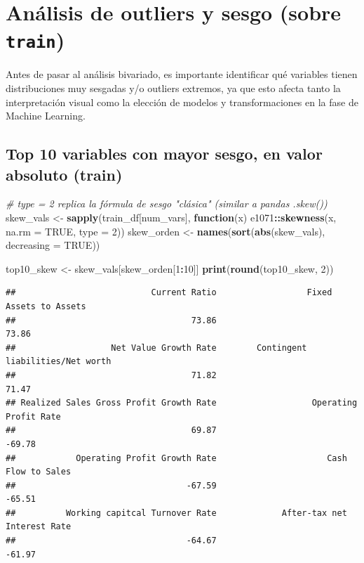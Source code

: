 \documentclass[
]{book}
\newenvironment{Shaded}{\begin{snugshade}}{\end{snugshade}}
\newcommand{\AttributeTok}[1]{\textcolor[rgb]{0.13,0.29,0.53}{#1}}
\newcommand{\CommentTok}[1]{\textcolor[rgb]{0.56,0.35,0.01}{\textit{#1}}}
\newcommand{\ConstantTok}[1]{\textcolor[rgb]{0.56,0.35,0.01}{#1}}
\newcommand{\ControlFlowTok}[1]{\textcolor[rgb]{0.13,0.29,0.53}{\textbf{#1}}}
\newcommand{\DecValTok}[1]{\textcolor[rgb]{0.00,0.00,0.81}{#1}}
\newcommand{\FunctionTok}[1]{\textcolor[rgb]{0.13,0.29,0.53}{\textbf{#1}}}
\newcommand{\NormalTok}[1]{#1}
\newcommand{\OtherTok}[1]{\textcolor[rgb]{0.56,0.35,0.01}{#1}}
\newcommand{\SpecialCharTok}[1]{\textcolor[rgb]{0.81,0.36,0.00}{\textbf{#1}}}
\begin{document}
\chapter{\texorpdfstring{Análisis de outliers y sesgo (sobre \texttt{train})}{Análisis de outliers y sesgo (sobre train)}}\label{anuxe1lisis-de-outliers-y-sesgo-sobre-train}

Antes de pasar al análisis bivariado, es importante identificar qué variables tienen
distribuciones muy sesgadas y/o outliers extremos, ya que esto afecta tanto la
interpretación visual como la elección de modelos y transformaciones en la fase de
Machine Learning.

\section{Top 10 variables con mayor sesgo, en valor absoluto (train)}\label{top-10-variables-con-mayor-sesgo-en-valor-absoluto-train}

\begin{Shaded}
\begin{Highlighting}[]
\CommentTok{\# type = 2 replica la fórmula de sesgo "clásica" (similar a pandas .skew())}
\NormalTok{skew\_vals }\OtherTok{\textless{}{-}} \FunctionTok{sapply}\NormalTok{(train\_df[num\_vars], }\ControlFlowTok{function}\NormalTok{(x) e1071}\SpecialCharTok{::}\FunctionTok{skewness}\NormalTok{(x, }\AttributeTok{na.rm =} \ConstantTok{TRUE}\NormalTok{, }\AttributeTok{type =} \DecValTok{2}\NormalTok{))}
\NormalTok{skew\_orden }\OtherTok{\textless{}{-}} \FunctionTok{names}\NormalTok{(}\FunctionTok{sort}\NormalTok{(}\FunctionTok{abs}\NormalTok{(skew\_vals), }\AttributeTok{decreasing =} \ConstantTok{TRUE}\NormalTok{))}

\NormalTok{top10\_skew }\OtherTok{\textless{}{-}}\NormalTok{ skew\_vals[skew\_orden[}\DecValTok{1}\SpecialCharTok{:}\DecValTok{10}\NormalTok{]]}
\FunctionTok{print}\NormalTok{(}\FunctionTok{round}\NormalTok{(top10\_skew, }\DecValTok{2}\NormalTok{))}
\end{Highlighting}
\end{Shaded}

\begin{verbatim}
##                           Current Ratio                  Fixed Assets to Assets 
##                                   73.86                                   73.86 
##                   Net Value Growth Rate        Contingent liabilities/Net worth 
##                                   71.82                                   71.47 
## Realized Sales Gross Profit Growth Rate                   Operating Profit Rate 
##                                   69.87                                  -69.78 
##            Operating Profit Growth Rate                      Cash Flow to Sales 
##                                  -67.59                                  -65.51 
##          Working capitcal Turnover Rate             After-tax net Interest Rate 
##                                  -64.67                                  -61.97
\end{verbatim}
\end{document}
